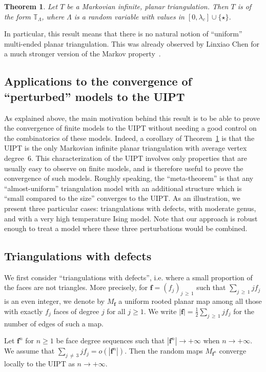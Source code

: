 \documentclass[10pt]{amsart}
\newtheorem{theo}{Theorem}[section]
\theoremstyle{definition}\newtheorem{defi}[theo]{Definition}\newtheorem{rema}[theo]{Remark}\newtheorem{exam}[theo]{Example}\newtheorem{exem}[theo]{Example}\newtheorem{nota}[theo]{Notation}
\newcommand{\TT}{\mathbb{T}}
\newcommand{\bff}{\mathbf{f}}
\begin{document}
\begin{theo}\label{main_thm}
Let $T$ be a Markovian infinite, planar triangulation. Then $T$ is of the form $\TT_{\Lambda}$, where $\Lambda$ is a random variable with values in $[0,\lambda_c] \cup \{ \star \}$.
\end{theo}


In particular, this result means that there is no natural notion of ``uniform'' multi-ended planar triangulation. This was already observed by Linxiao Chen for a much stronger version of the Markov property~\cite{ChPerso}.

\subsection*{Applications to the convergence of ``perturbed'' models to the UIPT}
As explained above, the main motivation behind this result is to be able to prove the convergence of finite models to the UIPT without needing a good control on the combinatorics of these models. Indeed, a corollary of Theorem~\ref{main_thm} is that the UIPT is the only Markovian infinite planar triangulation with average vertex degree~$6$. This characterization of the UIPT involves only properties that are usually easy to observe on finite models, and is therefore useful to prove the convergence of such models. Roughly speaking, the ``meta-theorem'' is that any ``almost-uniform'' triangulation model with an additional structure which is ``small compared to the size'' converges to the UIPT. As an illustration, we present three particular cases: triangulations with defects, with moderate genus, and with a very high temperature Ising model. Note that our approach is robust enough to treat a model where these three perturbations would be combined.

\subsection*{Triangulations with defects}
We first consider ``triangulations with defects'', i.e. where a small proportion of the faces are not triangles. More precisely, for $\bff=(f_j)_{j\,\geq\,1}$ such that $\sum_{j\,\geq\,1} j f_j$ is an even integer, we denote by $M_{\bff}$ a uniform rooted planar map among all those with exactly $f_j$ faces of degree $j$ for all $j \geq 1$. We write $|\bff|=\frac{1}{2} \sum_{j\,\geq\,1} j f_j$ for the number of edges of such a map.

\begin{coro}\label{cor_triang_with_defects}
Let $\bff^n$ for $n \geq 1$ be face degree sequences such that $|\bff^n| \to +\infty$ when $n \to +\infty$. We assume that $\sum_{j\,\ne\,3} j f_j = o (|\bff^n|)$. Then the random maps $M_{\bff^n}$ converge locally to the UIPT as $n \to +\infty$.
\end{coro}
\end{document}
